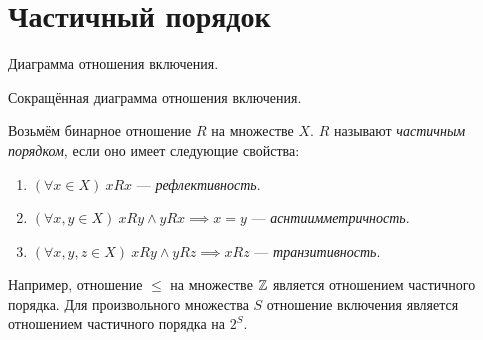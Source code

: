 \section{Частичный порядок}

\begin{marginfigure}[1cm]
	\center

	\caption{Диаграмма отношения включения.}\label{fig:inc_diag}
\end{marginfigure}

\begin{marginfigure}
	\center

	\caption{Сокращённая диаграмма отношения включения.}\label{fig:inc_diag_short}
\end{marginfigure}

Возьмём бинарное отношение $R$ на множестве $X$. $R$ называют {\it частичным порядком},
если оно имеет следующие свойства:
\begin{enumerate}
	\item{}$(\forall x\in X)~xRx$ --- {\it рефлективность}.
	\item{}$(\forall x,y\in X)~xRy\land yRx\implies x=y$
		--- {\it аснтиимметричность}.
	\item{}$(\forall x,y,z\in X)~xRy\land yRz\implies xRz$ --- {\it транзитивность}.
\end{enumerate}
Например, отношение $\leq$ на множестве $\mathbb Z$ является отношением частичного порядка.
Для произвольного множества $S$ отношение включения является
отношением частичного порядка на $2^{S}$.

